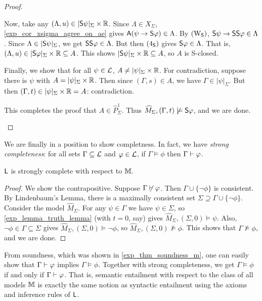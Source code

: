 \begin{proof}
\begin{itemize}
    Now, take any $(\Lambda, u) \in |\S\psi|_\Sigma \times \R$.
    Since $\Lambda \in X_\Sigma$, \cref{exp_cor_xsigma_agree_on_ae} gives
    $\A(\psi \limplies \S\phi) \in \Lambda$. By $\weakeningS$,
    $\S\psi \limplies \S\S\phi \in \Lambda$. Since $\Lambda \in
    |\S\psi|_\Sigma$, we get $\S\S\phi \in \Lambda$. But then
    $\foursoundness$ gives $\S\phi \in \Lambda$. That is, $(\Lambda,
    u) \in |\S\phi|_\Sigma \times \R \subseteq A$. This shows
    $|\S\psi|_\Sigma \times \R \subseteq A$, so $A$ is
    S-closed.

    Finally, we show that for all $\psi \in \cL$, $A \ne
    |\psi|_\Sigma \times \R$.  For contradiction, suppose there is
    $\psi$ with $A = |\psi|_\Sigma \times \R$. Then since $(\Gamma,
    s) \in A$, we have $\Gamma \in |\psi|_\Sigma$. But then $(\Gamma,
    t) \in |\psi|_\Sigma \times \R = A$: contradiction.

    This completes the proof that $A \in \widehat{P}_\Sigma^1$.  Thus
    $\widehat{M}_\Sigma, (\Gamma, t) \not\models \S\phi$, and we are done.
    \end{itemize}
\end{proof}

We are finally in a position to show completness. In fact, we have \emph{strong
completeness}: for all sets $\Gamma \subseteq \cL$ and $\phi \in \cL$, if
$\Gamma \models \phi$ then $\Gamma \entails \phi$.

\begin{theorem}
\label{exp_thm_strong_completeness}
    $\sL$ is strongly complete with respect to $\M$.
\end{theorem}

\begin{proof}
We show the contrapositive. Suppose $\Gamma \not\entails \phi$.
Then $\Gamma \cup \{\neg\phi\}$ is consistent. By Lindenbaum's
Lemma, there is a maximally consistent set $\Sigma \supseteq \Gamma
\cup \{\neg\phi\}$. Consider the model $\widehat{M}_\Sigma$. For
any $\psi \in \Gamma$ we have $\psi \in \Sigma$, so
\cref{exp_lemma_truth_lemma} (with $t = 0$, say) gives
$\widehat{M}_\Sigma, (\Sigma, 0) \models \psi$. Also,
$\neg\phi \in \Gamma \subseteq \Sigma$ gives
$\widehat{M}_\Sigma, (\Sigma, 0) \models \neg\phi$, so
$\widehat{M}_\Sigma, (\Sigma, 0) \not\models \phi$. This shows that
$\Gamma \not\models \phi$, and we are done.
\end{proof}

From soundness, which was shown in \cref{exp_thm_soundness_m}, one can easily
show that $\Gamma \entails \phi$ implies $\Gamma \models \phi$. Together with
strong completeness, we get $\Gamma \models \phi$ if and only if $\Gamma
\entails \phi$. That is, semantic entailment with respect to the class of all
models $\M$ is exactly the same notion as syntactic entailment using the axioms
and inference rules of $\sL$.

